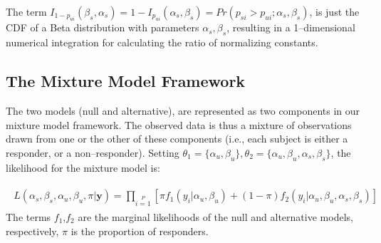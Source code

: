 \documentclass[11pt]{article}
\begin{document}

The term $I_{1-p_{ui}}(\beta_s,\alpha_s)=1-I_{p_{ui}}(\alpha_s,\beta_s)=Pr(p_{si} > p_{ui}; \alpha_s,\beta_s)$, is just the CDF of a Beta distribution with parameters $\alpha_s,\beta_s$, resulting in a 1--dimensional numerical integration for calculating the ratio of normalizing constants.


\subsection{The Mixture Model Framework}

The two models (null and alternative), are represented as two components in our mixture model framework. The observed data is thus a mixture of observations drawn from one or the other of these components (i.e., each subject is either a responder, or a non--responder). Setting  $\theta_1=\{\alpha_u,\beta_u\},\theta_2=\{\alpha_u,\beta_u,\alpha_s,\beta_s\}$, the likelihood for the mixture model is:



 \begin{align}
\begin{split}
L(\alpha_s,\beta_s,\alpha_u,\beta_u,\pi|\mathbf{y})=\prod\limits_{i=1}\limits^P\left[ \pi f_1(y_i|\alpha_u,\beta_u) +(1-\pi)f_2(y_i|\alpha_u,\beta_u,\alpha_s,\beta_s) \right] 
\end{split}
\end{align}
The terms $f_1$,$f_2$ are the marginal likelihoods of the null and alternative models, respectively, $\pi$ is the proportion of responders. 
\end{document}

